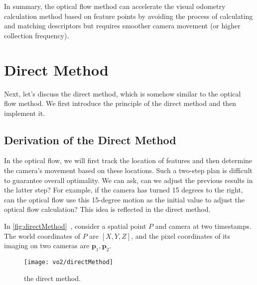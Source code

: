 In summary, the optical flow method can accelerate the visual odometry calculation method based on feature points by avoiding the process of calculating and matching descriptors but requires smoother camera movement (or higher collection frequency).

\section{Direct Method}
Next, let's discuss the direct method, which is somehow similar to the optical flow method. We first introduce the principle of the direct method and then implement it.

\subsection{Derivation of the Direct Method}
In the optical flow, we will first track the location of features and then determine the camera's movement based on these locations. Such a two-step plan is difficult to guarantee overall optimality. We can ask, can we adjust the previous results in the latter step? For example, if the camera has turned 15 degrees to the right, can the optical flow use this 15-degree motion as the initial value to adjust the optical flow calculation? This idea is reflected in the direct method.

In \autoref{fig:directMethod}~, consider a spatial point $P$ and camera at two timestamps. The world coordinates of $P$ are $[X,Y,Z]$, and the pixel coordinates of its imaging on two cameras are $\mathbf{p}_1, \mathbf{p}_2$.

\begin{figure}[!htp]
	\centering
	\texttt{[image: vo2/directMethod]}
	\caption{the direct method.}
	\label{fig:directMethod}
\end{figure}

